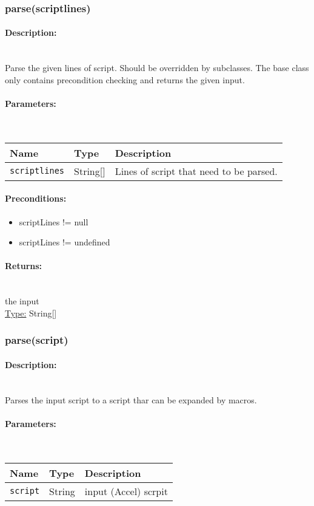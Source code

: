 \subsubsection{parse(scriptlines)} 
\paragraph{Description:} \hfill \\ 
Parse the given lines of script.
Should be overridden by subclasses.
The base class only contains precondition checking and returns the given input.
\paragraph{Parameters:} \hfill \\ 
\begin{tabular}{|l|l|l|}
\hline
\textbf{Name} & \textbf{Type} & \textbf{Description} \\ 
\hline
\texttt{scriptlines} & String[] & Lines of script that need to be parsed.\\ 
\hline
\end{tabular}
\paragraph{Preconditions:} 
\begin{itemize}  
\item  scriptLines != null
\item  scriptLines != undefined
\end{itemize}  
\paragraph{Returns:} \hfill \\ 
the input\\ 
\underline{Type:} String[]
\subsubsection{parse(script)} 
\paragraph{Description:} \hfill \\ 
Parses the input script to a script thar can be expanded by macros.
\paragraph{Parameters:} \hfill \\ 
\begin{tabular}{|l|l|l|}
\hline
\textbf{Name} & \textbf{Type} & \textbf{Description} \\ 
\hline
\texttt{script} & String & input (Accel) scrpit\\ 
\hline
\end{tabular}
